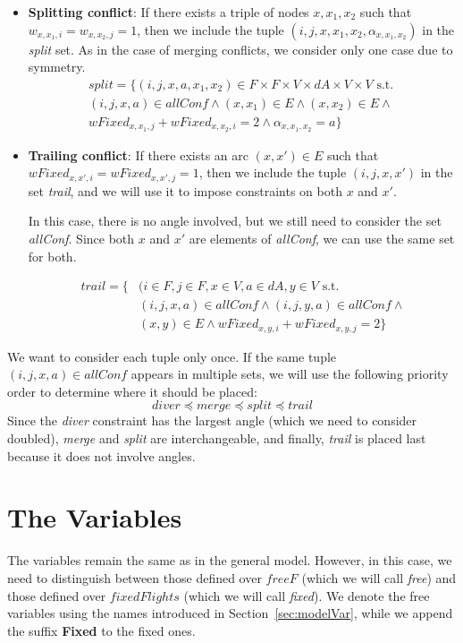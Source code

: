 \documentclass[../thesis.tex]{subfiles}
\begin{document}
\begin{itemize}
    \item \textbf{Splitting conflict}: If there exists a triple of nodes $x, x_1, x_2$ such that $w_{x,x_1,i} = w_{x,x_2,j} = 1$, then we include the tuple $(i,j,x,x_1,x_2, \alpha_{x,x_1,x_2})$ in the \textit{split} set. As in the case of merging conflicts, we consider only one case due to symmetry.
    \begin{align}
        split = \{(i, j, x, a, x_1, x_2) \in F \times F \times V \times dA \times V \times V \text{ s.t. } \nonumber\\
        (i,j,x,a) \in allConf \land (x,x_1) \in E \land (x,x_2) \in E \land \nonumber\\
        wFixed_{x,x_1,j} + wFixed_{x,x_2,i} = 2 \land \alpha_{x,x_1,x_2} = a \}
    \end{align}
    
    \item \textbf{Trailing conflict}: If there exists an arc $(x,x') \in E$ such that $wFixed_{x,x',i} = wFixed_{x,x',j} = 1$, then we include the tuple $(i,j,x,x')$ in the set \textit{trail}, and we will use it to impose constraints on both $x$ and $x'$. 
    
    In this case, there is no angle involved, but we still need to consider the set \textit{allConf}. Since both $x$ and $x'$ are elements of \textit{allConf}, we can use the same set for both.
    
    \begin{align}
        trail = \{ &(i \in F, j \in F, x \in V, a \in dA, y \in V \text{ s.t. } \nonumber\\
        & (i,j,x,a) \in allConf \land (i,j,y,a) \in allConf \land \nonumber\\
        & (x,y) \in E \land wFixed_{x,y,i} + wFixed_{x,y,j} = 2 \}
    \end{align}
\end{itemize}
We want to consider each tuple only once. If the same tuple $(i,j,x,a) \in allConf$ appears in multiple sets, we will use the following priority order to determine where it should be placed:  
\[
diver \preceq merge \preceq split \preceq trail
\]
Since the \textit{diver} constraint has the largest angle (which we need to consider doubled), \textit{merge} and \textit{split} are interchangeable, and finally, \textit{trail} is placed last because it does not involve angles.

\section{The Variables}
The variables remain the same as in the general model. However, in this case, we need to distinguish between those defined over $freeF$ (which we will call \textit{free}) and those defined over $fixedFlights$ (which we will call \textit{fixed}). We denote the free variables using the names introduced in Section~\ref{sec:modelVar}, while we append the suffix \textbf{Fixed} to the fixed ones.
\end{document}
